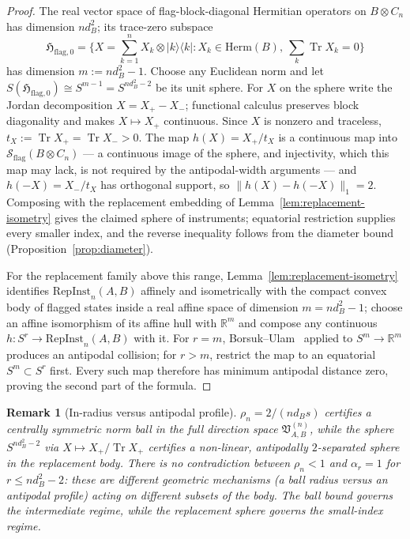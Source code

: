 \documentclass[11pt,a4paper]{article}
\newtheorem{remark}[theorem]{Remark}
\newcommand{\Herm}{\mathrm{Herm}}
\newcommand{\Sstate}{\mathcal{S}}
\newcommand{\RepInst}{\mathrm{RepInst}}
\newcommand{\Tr}{\operatorname{Tr}}
\begin{document}
\begin{proof}
The real vector space of flag-block-diagonal Hermitian operators on $B\otimes C_n$ has dimension $nd_B^2$; its trace-zero subspace
\[
\mathfrak H_{\mathrm{flag},0}
=\Big\{X=\sum_{k=1}^nX_k\otimes|k\rangle\langle k|:
X_k\in\Herm(B),\ \sum_k\Tr X_k=0\Big\}
\]
has dimension $m:=nd_B^2-1$. Choose any Euclidean norm and let $S(\mathfrak H_{\mathrm{flag},0})\cong S^{m-1}=S^{nd_B^2-2}$ be its unit sphere. For $X$ on the sphere write the Jordan decomposition $X=X_+-X_-$; functional calculus preserves block diagonality and makes $X\mapsto X_+$ continuous. Since $X$ is nonzero and traceless, $t_X:=\Tr X_+=\Tr X_->0$. The map $h(X)=X_+/t_X$ is a continuous map into $\Sstate_{\mathrm{flag}}(B\otimes C_n)$ --- a continuous image of the sphere, and injectivity, which this map may lack, is not required by the antipodal-width arguments --- and $h(-X)=X_-/t_X$ has orthogonal support, so $\|h(X)-h(-X)\|_1=2$. Composing with the replacement embedding of Lemma~\ref{lem:replacement-isometry} gives the claimed sphere of instruments; equatorial restriction supplies every smaller index, and the reverse inequality follows from the diameter bound (Proposition~\ref{prop:diameter}).

For the replacement family above this range, Lemma~\ref{lem:replacement-isometry} identifies $\RepInst_n(A,B)$ affinely and isometrically with the compact convex body of flagged states inside a real affine space of dimension $m=nd_B^2-1$; choose an affine isomorphism of its affine hull with $\mathbb R^{m}$ and compose any continuous $h:S^r\to\RepInst_n(A,B)$ with it. For $r=m$, Borsuk--Ulam~\cite{Matousek2003} applied to $S^{m}\to\mathbb R^{m}$ produces an antipodal collision; for $r>m$, restrict the map to an equatorial $S^m\subset S^r$ first. Every such map therefore has minimum antipodal distance zero, proving the second part of the formula.
\end{proof}

\begin{remark}[In-radius versus antipodal profile]
\label{rem:inradius-vs-alpha}
$\rho_n=2/(nd_Bs)$ certifies a centrally symmetric norm ball in the full direction space $\mathfrak V_{A,B}^{(n)}$, while the sphere $S^{nd_B^2-2}$ via $X\mapsto X_+/\Tr X_+$ certifies a non-linear, antipodally $2$-separated sphere in the replacement body. There is no contradiction between $\rho_n<1$ and $\alpha_r=1$ for $r\le nd_B^2-2$: these are different geometric mechanisms (a ball radius versus an antipodal profile) acting on different subsets of the body. The ball bound governs the intermediate regime, while the replacement sphere governs the small-index regime.
\end{remark}
\end{document}
